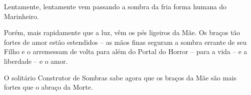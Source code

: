Lentamente, lentamente vem passando a sombra da fria forma humana do
Marinheiro.

\smallskip
Porém, mais rapidamente que a luz, vêm os pés ligeiros da Mãe. Os braços
tão fortes de amor estão estendidos -- as mãos finas seguram a sombra
errante de seu Filho e o arremessam de volta para além do Portal do
Horror -- para a vida -- e a liberdade -- e o amor.

\smallskip
O solitário Construtor de Sombras sabe agora que os braços da Mãe são
mais fortes que o abraço da Morte.


